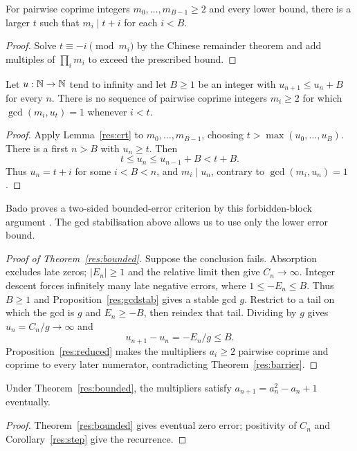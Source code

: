 \documentclass[11pt]{article}
\begin{document}
\begin{lemma}\label{res:crt}
For pairwise coprime integers $m_0,\ldots,m_{B-1}\ge2$ and every lower
bound, there is a larger $t$ such that $m_i\mid t+i$ for each $i<B$.
\end{lemma}
\begin{proof}
Solve $t\equiv-i\pmod{m_i}$ by the Chinese remainder theorem and add
multiples of $\prod_i m_i$ to exceed the prescribed bound.
\end{proof}

\begin{theorem}\label{res:barrier}
Let $u:\mathbb{N}\to\mathbb{N}$ tend to infinity and let $B\ge1$ be an integer with
$u_{n+1}\le u_n+B$ for every $n$. There is no sequence of pairwise coprime
integers $m_i\ge2$ for which $\gcd(m_i,u_t)=1$ whenever $i<t$.
\end{theorem}
\begin{proof}
Apply Lemma~\ref{res:crt} to $m_0,\ldots,m_{B-1}$, choosing
$t>\max(u_0,\ldots,u_B)$. There is a first $n>B$ with $u_n\ge t$.
Then
\[
 t\le u_n\le u_{n-1}+B<t+B.
\]
Thus $u_n=t+i$ for some $i<B<n$, and $m_i\mid u_n$, contrary to
$\gcd(m_i,u_n)=1$.
\end{proof}

Bado proves a two-sided bounded-error criterion by this forbidden-block
argument \cite[Theorem~5.1, pp.~4--5]{bado2026}. The gcd stabilisation
above allows us to use only the lower error bound.

\begin{proof}[Proof of Theorem~\ref{res:bounded}]
Suppose the conclusion fails. Absorption excludes late zeros;
$|E_n|\ge1$ and the relative limit then give $C_n\to\infty$.
Integer descent forces infinitely many late negative errors, where
$1\le-E_n\le B$. Thus $B\ge1$ and Proposition~\ref{res:gcdstab}
gives a stable gcd $g$. Restrict to a tail on which the gcd is $g$
and $E_n\ge-B$, then reindex that tail. Dividing by $g$ gives
$u_n=C_n/g\to\infty$ and
\[
 u_{n+1}-u_n=-E_n/g\le B.
\]
Proposition~\ref{res:reduced} makes the multipliers $a_i\ge2$ pairwise
coprime and coprime to every later numerator, contradicting
Theorem~\ref{res:barrier}.
\end{proof}

\begin{corollary}\label{res:cor}
Under Theorem~\ref{res:bounded}, the multipliers satisfy
$a_{n+1}=a_n^2-a_n+1$ eventually.
\end{corollary}
\begin{proof}
Theorem~\ref{res:bounded} gives eventual zero error; positivity of $C_n$
and Corollary~\ref{res:step} give the recurrence.
\end{proof}
\end{document}
